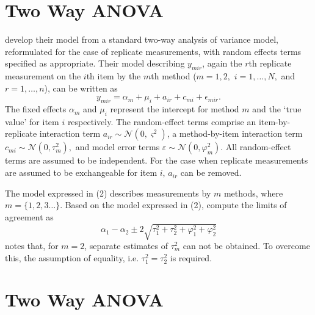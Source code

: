 \documentclass[12pt, a4paper]{report}
\theoremstyle{plain}
\theoremstyle{definition}
\theoremstyle{remark}
\begin{document}
	\bigskip
	
	\section{Two Way ANOVA}
	
	\citet{BXC2008} develop their model from a standard two-way analysis of variance model, reformulated for the case of replicate measurements, with random effects terms specified as appropriate. 
	Their model describing $y_{mir} $, again the $r$th replicate measurement on the $i$th item by the $m$th method ($m=1,2,$ $i=1,\ldots,N,$ and $r = 1,\ldots,n$), can be written as
	\begin{equation}\label{BXC-model}
	y_{mir}  = \alpha_{m} + \mu_{i} + a_{ir} + c_{mi} + \epsilon_{mir}.
	\end{equation}
	The fixed effects $\alpha_{m}$ and $\mu_{i}$  represent the intercept for method $m$ and the `true value' for item $i$ respectively. The random-effect terms comprise an item-by-replicate interaction term $a_{ir} \sim \mathcal{N}(0,\varsigma^{2})$, a method-by-item interaction term $c_{mi} \sim \mathcal{N}(0,\tau^{2}_{m}),$ and model error terms $\varepsilon \sim \mathcal{N}(0,\varphi^{2}_{m}).$ All random-effect terms are assumed to be independent.
	For the case when replicate measurements are assumed to be exchangeable for item $i$, $a_{ir}$ can be removed.
	
	The model expressed in (2) describes measurements by $m$ methods, where $m = \{1,2,3\ldots\}$. Based on the model expressed in (2), \citet{BXC2008} compute the limits of agreement as
	\[
	\alpha_1 - \alpha_2 \pm 2 \sqrt{ \tau^2_1 +  \tau^2_2 +  \varphi^2_1 +  \varphi^2_2 }
	\]
	\citet{BXC2008} notes that, for $m=2$,  separate estimates of $\tau^2_m$ can not be obtained. To overcome this, the assumption of equality, i.e. $\tau^2_1 = \tau^2_2$ is required.
	
	
	
	\section{Two Way ANOVA}
	
\end{document}
